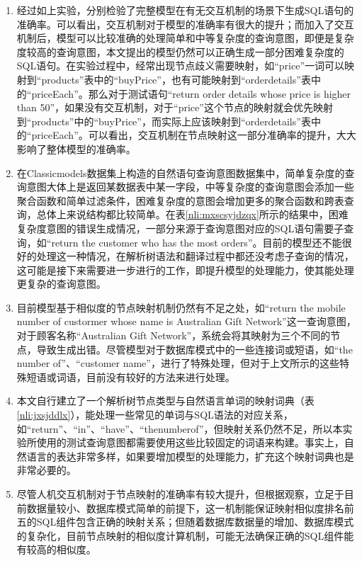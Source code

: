 \begin{enumerate}
    \item 经过如上实验，分别检验了完整模型在有无交互机制的场景下生成SQL语句的准确率。可以看出，交互机制对于模型的准确率有很大的提升；而加入了交互机制后，模型可以比较准确的处理简单和中等复杂度的查询意图，即便是复杂度较高的查询意图，本文提出的模型仍然可以正确生成一部分困难复杂度的SQL语句。在实验过程中，经常出现节点歧义需要映射，如“price”一词可以映射到“products”表中的“buyPrice”，也有可能映射到“orderdetails”表中的“priceEach”。那么对于测试语句“return order details whose price is higher than 50”，如果没有交互机制，对于“price”这个节点的映射就会优先映射到“products”中的“buyPrice”，而实际上应该映射到“orderdetails”表中的“priceEach”。可以看出，交互机制在节点映射这一部分准确率的提升，大大影响了整体模型的准确率。
    \item	在Classicmodels数据集上构造的自然语句查询意图数据集中，简单复杂度的查询意图大体上是返回某数据表中某一字段，中等复杂度的查询意图会添加一些聚合函数和简单过滤条件，困难复杂度的意图会增加更多的聚合函数和跨表查询，总体上来说结构都比较简单。在表\ref{nli:mxscsyjdzqx}所示的结果中，困难复杂度意图的错误生成情况，一部分来源于查询意图对应的SQL语句需要子查询，如“return the customer who has the most orders”。目前的模型还不能很好的处理这一种情况，在解析树语法和翻译过程中都还没考虑子查询的情况，这可能是接下来需要进一步进行的工作，即提升模型的处理能力，使其能处理更复杂的查询意图。
    \item	目前模型基于相似度的节点映射机制仍然有不足之处，如“return the mobile number of custormer whose name is Australian Gift Network”这一查询意图，对于顾客名称“Australian Gift Network”，系统会将其映射为三个不同的节点，导致生成出错。尽管模型对于数据库模式中的一些连接词或短语，如“the number of”、“customer name”，进行了特殊处理，但对于上文所示的这些特殊短语或词语，目前没有较好的方法来进行处理。
    \item	本文自行建立了一个解析树节点类型与自然语言单词的映射词典（表\ref{nli:jxsjddlx}），能处理一些常见的单词与SQL语法的对应关系，如“return”、“in”、“have”、“thenumberof”，但映射关系仍然不足，所以本实验所使用的测试查询意图都需要使用这些比较固定的词语来构建。事实上，自然语言的表达非常多样，如果要增加模型的处理能力，扩充这个映射词典也是非常必要的。
    \item	尽管人机交互机制对于节点映射的准确率有较大提升，但根据观察，立足于目前数据量较小、数据库模式简单的前提下，这一机制能保证映射相似度排名前五的SQL组件包含正确的映射关系；但随着数据库数据量的增加、数据库模式的复杂化，目前节点映射的相似度计算机制，可能无法确保正确的SQL组件能有较高的相似度。
\end{enumerate}

